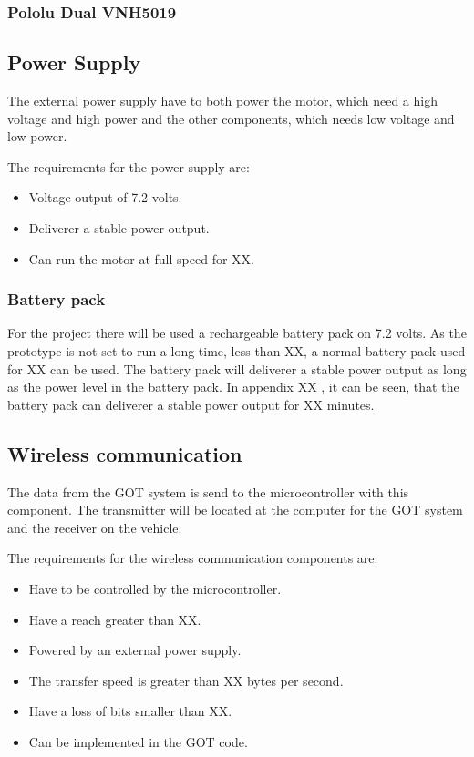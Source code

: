 \subsubsection{Pololu Dual VNH5019}


\subsection{Power Supply}
The external power supply have to both power the motor, which need a high voltage and high power and the other components, which needs low voltage and low power.

The requirements for the power supply are:
\begin{itemize}
\item Voltage output of 7.2 volts. 
\item Deliverer a stable power output.
\item Can run the motor at full speed for XX. 
\end{itemize}

\subsubsection{Battery pack}
For the project there will be used a rechargeable battery pack on 7.2 volts. As the prototype is not set to run a long time, less than XX, a normal battery pack used for XX  can be used. The battery pack will deliverer a stable power output as long as the power level in the battery pack. In appendix XX , it can be seen, that the battery pack can deliverer a stable power output for XX minutes.


\subsection{Wireless communication}
The data from the GOT system is send to the microcontroller with this component. The transmitter will be located at the computer for the GOT system and the receiver on the vehicle.

The requirements for the wireless communication components are:
\begin{itemize}
\item Have to be controlled by the microcontroller.
\item Have a reach greater than XX. 
\item Powered by an external power supply.
\item The transfer speed is greater than XX bytes per second. 
\item Have a loss of bits smaller than XX. 
\item Can be implemented in the GOT code.
\end{itemize}

